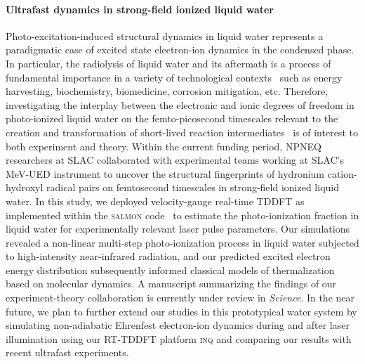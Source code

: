 

\paragraph{Ultrafast dynamics in strong-field ionized liquid water} 


Photo-excitation-induced structural dynamics in liquid water represents a paradigmatic case of excited state electron-ion dynamics in the condensed phase. 
In particular, the radiolysis of liquid water and its aftermath is a process of fundamental importance in a variety of technological contexts~\cite{Garrett2005} such as energy harvesting, biochemistry, biomedicine, corrosion mitigation, etc. 
Therefore, investigating the interplay between the electronic and ionic degrees of freedom in photo-ionized liquid water on the femto-picosecond timescales relevant to the creation and transformation of short-lived reaction intermediates~\cite{Loh2020} is of interest to both experiment and theory.
Within the current funding period, NPNEQ researchers at SLAC collaborated with experimental teams working at SLAC's MeV-UED instrument to uncover the structural fingerprints of hydronium cation-hydroxyl radical pairs on femtosecond timescales in strong-field ionized liquid water. 
In this study, we deployed velocity-gauge real-time TDDFT as implemented within the \textsc{salmon} code~\cite{salmon} to estimate the photo-ionization fraction in liquid water for experimentally relevant laser pulse parameters. 
Our simulations revealed a non-linear multi-step photo-ionization process in liquid water subjected to high-intensity near-infrared radiation, and our predicted excited electron energy distribution subsequently informed classical models of thermalization based on molecular dynamics. 
A manuscript summarizing the findings of our experiment-theory collaboration is currently under review in \emph{Science}.
In the near future, we plan to further extend our studies in this prototypical water system by simulating non-adiabatic Ehrenfest electron-ion dynamics during and after laser illumination using our RT-TDDFT platform \textsc{inq} and comparing our results with recent ultrafast experiments. 


